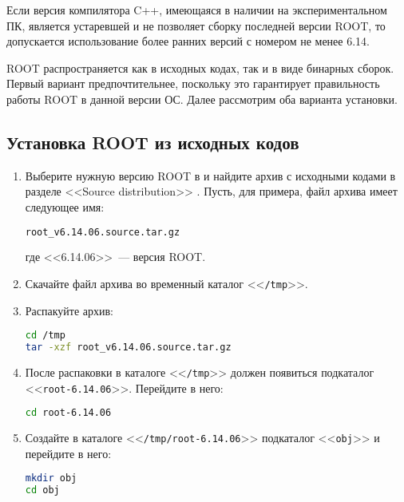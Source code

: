 \documentclass[12pt, a4paper, oneside, onecolumn]{book}
\newcommand{\ROOT}{\mbox{ROOT}}
\newcommand{\DIRECTORY}[1]{<<{\tt #1}>>}
\begin{document}
Если версия компилятора C++, имеющаяся в наличии на экспериментальном ПК, является устаревшей и не позволяет сборку последней версии \ROOT{}, то допускается использование более ранних версий с номером не менее 6.14.

\ROOT{} распространяется как в исходных кодах, так и в виде бинарных сборок. Первый вариант предпочтительнее, поскольку это гарантирует правильность работы \ROOT{} в данной версии ОС. Далее рассмотрим оба варианта установки.

\subsection{Установка \ROOT{} из исходных кодов}
\label{sec-build-root-from-src}

\begin{enumerate}

\item Выберите нужную версию \ROOT{} в \cite{RootDownload} и найдите архив с исходными кодами в разделе <<Source distribution>>  . Пусть, для примера, файл архива имеет следующее имя:

\begin{lstlisting}[language=bash]
root_v6.14.06.source.tar.gz
\end{lstlisting}
 
\noindent где <<6.14.06>>~--- версия \ROOT{}.

\item Скачайте файл архива во временный каталог \DIRECTORY{/tmp}.

\item Распакуйте архив:

\begin{lstlisting}[language=bash]
cd /tmp
tar -xzf root_v6.14.06.source.tar.gz
\end{lstlisting}

\item После распаковки в каталоге \DIRECTORY{/tmp} должен появиться подкаталог \DIRECTORY{root-6.14.06}. Перейдите в него:

\begin{lstlisting}[language=bash]
cd root-6.14.06
\end{lstlisting}

\item Создайте в каталоге \DIRECTORY{/tmp/root-6.14.06} подкаталог \DIRECTORY{obj} и перейдите в него:

\begin{lstlisting}[language=bash]
mkdir obj
cd obj
\end{lstlisting}


\end{enumerate}
\end{document}
